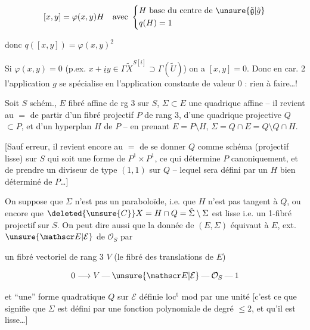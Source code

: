 \[
[x,y]=\varphi(x,y)H\quad\text{avec }\left\{\begin{aligned}&H\text{ base du centre de }\unsure{\tilde{\mathfrak g}|\tilde g}\\ &q(H)=1\end{aligned}\right.
\]

donc $q([x,y])=\varphi(x,y)^2$

Si $\varphi(x,y)=0$ (p.ex. $x+\underline i y\in\Gamma\tilde X^{S[i]}\supset\Gamma(\tilde U)$\unsure{\ldots}) on a $[x,y]=0$. Donc en car. 2 l'application $g$ se spécialise en l'application constante de valeur 0 : rien à faire\ldots !



Soit $S$ schém., $E$ fibré affine de rg 3 sur $S$, $\Sigma\subset E$ une quadrique affine  -- il revient au $=$ de partir d'un fibré projectif  $P$ de rang 3, d'une quadrique projective  $Q$\inserted{$(=\hat\Sigma)$}$\subset P$, et d'un hyperplan $H$ de $P$ -- en prenant $E=P\setminus H$, $\Sigma=Q\cap E=Q\setminus Q\cap H$. 

[Sauf erreur, il revient encore au $=$ de se donner $Q$ comme schéma (projectif lisse) sur $S$ qui soit une forme de $P^1\times P^1$, ce qui détermine $P$ canoniquement, et de prendre un diviseur  de type $(1,1)$ sur $Q$ -- lequel sera défini par un $H$ bien déterminé de $P$\ldots]

On suppose que $\Sigma$ n'est pas un paraboloïde,  i.e. que $H$ n'est pas tangent à $Q$, ou encore que $\deleted{\unsure{C}}X=H\cap Q=\hat\Sigma\setminus\Sigma$ est lisse i.e. un 1-fibré projectif sur $S$. On peut dire aussi que la donnée de $(E,\Sigma)$ équivaut à $E$,  ext. $\unsure{\mathscr E|\mathcal E}$ de $\mathcal O_S$ par


un fibré vectoriel de rang 3 $V$ (le fibré des translations de $E$)

\[
0\longrightarrow V\mathbin{\text{---}}\unsure{\mathscr E|\mathcal E}\mathbin{\text{---}}\mathcal O_S\mathbin{\text{---}}1
\]

et ``une'' forme quadratique $Q$  sur $\mathscr E$ définie loc$^{\mathrm t}$ mod  par une unité [c'est ce que signifie que $\Sigma$ est défini par une fonction polynomiale de degré $\leq2$, et qu'il est  lisse\ldots]

